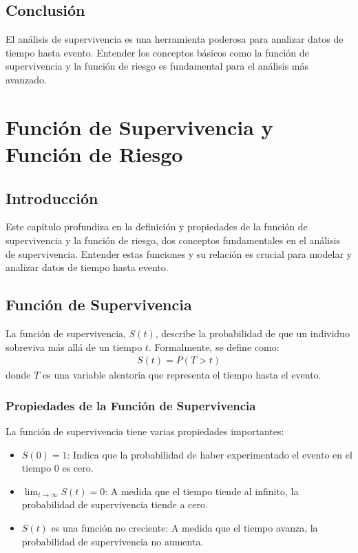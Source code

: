 \documentclass[a4paper]{report} %
\begin{document}
\section{Conclusi\'on}
El an\'alisis de supervivencia es una herramienta poderosa para analizar datos de tiempo hasta evento. Entender los conceptos b\'asicos como la funci\'on de supervivencia y la funci\'on de riesgo es fundamental para el an\'alisis m\'as avanzado.


\chapter{Función de Supervivencia y Función de Riesgo}
\section{Introducci\'on}
Este cap\'itulo profundiza en la definici\'on y propiedades de la funci\'on de supervivencia y la funci\'on de riesgo, dos conceptos fundamentales en el análisis de supervivencia. Entender estas funciones y su relaci\'on es crucial para modelar y analizar datos de tiempo hasta evento.

\section{Funci\'on de Supervivencia}
La funci\'on de supervivencia, $S(t)$, describe la probabilidad de que un individuo sobreviva más allá de un tiempo $t$. Formalmente, se define como:
\begin{eqnarray*}
S(t) = P(T > t)
\end{eqnarray*}
donde $T$ es una variable aleatoria que representa el tiempo hasta el evento.

\subsection{Propiedades de la Funci\'on de Supervivencia}
La funci\'on de supervivencia tiene varias propiedades importantes:
\begin{itemize}
    \item $S(0) = 1$: Indica que la probabilidad de haber experimentado el evento en el tiempo 0 es cero.
    \item $\lim_{t \to \infty} S(t) = 0$: A medida que el tiempo tiende al infinito, la probabilidad de supervivencia tiende a cero.
    \item $S(t)$ es una funci\'on no creciente: A medida que el tiempo avanza, la probabilidad de supervivencia no aumenta.
\end{itemize}
\end{document}
